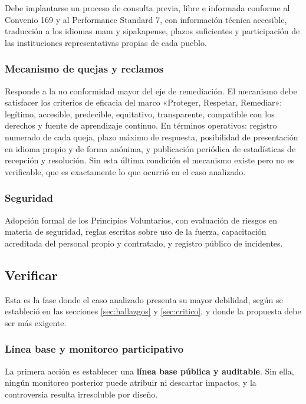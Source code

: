 Debe implantarse un proceso de consulta previa, libre e informada conforme al
Convenio 169 y al Performance Standard 7, con información técnica accesible,
traducción a los idiomas mam y sipakapense, plazos suficientes y participación de
las instituciones representativas propias de cada pueblo.

\subsubsection{Mecanismo de quejas y reclamos}

Responde a la no conformidad mayor del eje de remediación. El mecanismo debe
satisfacer los criterios de eficacia del marco «Proteger, Respetar, Remediar»:
legítimo, accesible, predecible, equitativo, transparente, compatible con los
derechos y fuente de aprendizaje continuo. En términos operativos: registro
numerado de cada queja, plazo máximo de respuesta, posibilidad de presentación en
idioma propio y de forma anónima, y publicación periódica de estadísticas de
recepción y resolución. Sin esta última condición el mecanismo existe pero no es
verificable, que es exactamente lo que ocurrió en el caso analizado.

\subsubsection{Seguridad}

Adopción formal de los Principios Voluntarios, con evaluación de riesgos en
materia de seguridad, reglas escritas sobre uso de la fuerza, capacitación
acreditada del personal propio y contratado, y registro público de incidentes.

\subsection{Verificar}

Esta es la fase donde el caso analizado presenta su mayor debilidad, según se
estableció en las secciones \ref{sec:hallazgos} y \ref{sec:critico}, y donde la
propuesta debe ser más exigente.

\subsubsection{Línea base y monitoreo participativo}

La primera acción es establecer una \textbf{línea base pública y auditable}. Sin
ella, ningún monitoreo posterior puede atribuir ni descartar impactos, y la
controversia resulta irresoluble por diseño.

